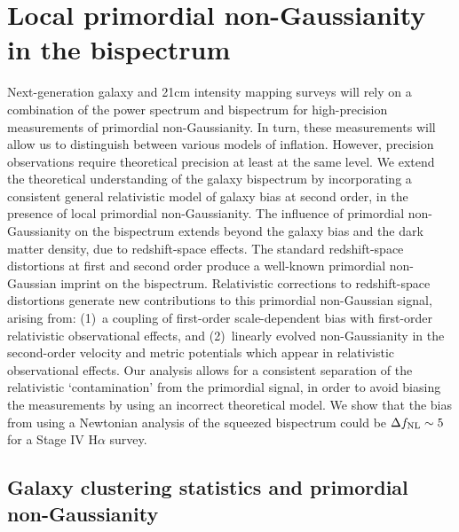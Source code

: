 
\chapter{Local primordial non-Gaussianity in the bispectrum}
\label{chapter:localpng}


Next-generation galaxy and 21cm intensity mapping surveys will rely on a combination of the power spectrum and bispectrum for high-precision measurements of primordial non-Gaussianity. In turn, these measurements will allow us to distinguish between various models of inflation. However, precision observations require theoretical precision at least at the same level. We extend the theoretical understanding of the galaxy bispectrum by incorporating a consistent general relativistic model of galaxy bias at second order, in the presence of local primordial non-Gaussianity. {The influence of primordial non-Gaussianity on the bispectrum extends beyond the  galaxy bias and the dark matter density, due to redshift-space effects. The standard redshift-space distortions at first and second order produce a well-known primordial non-Gaussian  imprint on the bispectrum. Relativistic corrections to redshift-space distortions
generate new contributions to this primordial non-Gaussian signal, arising from: (1)~a coupling of first-order scale-dependent bias with first-order relativistic observational effects, and (2)~linearly evolved non-Gaussianity in the second-order velocity and metric potentials which appear in relativistic observational effects.}
Our analysis allows for a consistent separation of the relativistic  `contamination' from the primordial signal, in order to avoid biasing the measurements by using an incorrect theoretical model. We show that the bias from using a Newtonian analysis of the squeezed bispectrum could be $\Delta f_\text{NL}\sim 5$ for a Stage IV H$\alpha$ survey.

\section{Galaxy clustering statistics and primordial non-Gaussianity}

